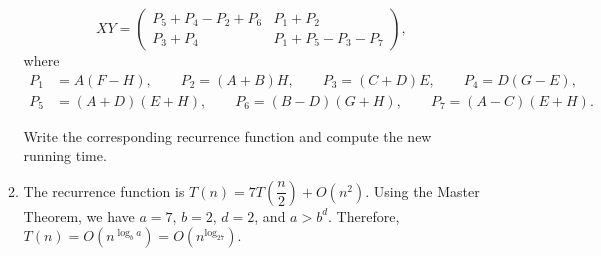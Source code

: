 \documentclass[12pt,a4paper]{article}
\makeatletter
\newtheorem*{solution}{Solution}
\theoremstyle{definition}
\renewenvironment{solution}[1][Solution] {\par\pushQED{\qed}\normalfont\topsep6\p@\@plus6\p@\relax\trivlist\item[\hskip\labelsep\bfseries#1\@addpunct{.}]\ignorespaces}{\popQED\endtrivlist\@endpefalse} \makeatother
\makeatother
\begin{document}
\begin{enumerate}
\begin{enumerate}
\begin{displaymath}
 XY=
\left(\begin{array}{c|c}
P_{5}+P_{4}-P_{2}+P_{6} & P_{1}+P_{2} \\
\hline
P_{3}+P_{4} & P_{1}+P_{5}-P_{3}-P_{7} \end{array}\right),
\end{displaymath}
where
\begin{align*}
P_{1}&=A(F-H), \qquad P_{2}=(A+B)H, \qquad P_{3}=(C+D)E, \qquad P_{4}=D(G-E),\\
P_{5}&=(A+D)(E+H),\qquad P_{6}=(B-D)(G+H),\qquad P_{7}=(A-C)(E+H).
\end{align*}

Write the corresponding recurrence function and compute the new running time.

\begin{solution}
The recurrence function is $T(n)=7T(\dfrac{n}{2})+O(n^2)$. Using the Master Theorem, we have $a=7$, $b=2$, $d=2$, and $a>b^d$. Therefore, $T(n)=O(n^{\log_ba})=O(n^{\log_27})$.
\end{solution}

\end{enumerate}


\end{enumerate}

\end{document}
